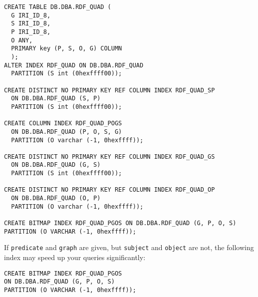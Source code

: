 \begin{siderules}
\begin{verbatim}
CREATE TABLE DB.DBA.RDF_QUAD (
  G IRI_ID_8,
  S IRI_ID_8,
  P IRI_ID_8,
  O ANY,
  PRIMARY key (P, S, O, G) COLUMN
  );
ALTER INDEX RDF_QUAD ON DB.DBA.RDF_QUAD
  PARTITION (S int (0hexffff00));

CREATE DISTINCT NO PRIMARY KEY REF COLUMN INDEX RDF_QUAD_SP
  ON DB.DBA.RDF_QUAD (S, P)
  PARTITION (S int (0hexffff00));

CREATE COLUMN INDEX RDF_QUAD_POGS
  ON DB.DBA.RDF_QUAD (P, O, S, G)
  PARTITION (O varchar (-1, 0hexffff));

CREATE DISTINCT NO PRIMARY KEY REF COLUMN INDEX RDF_QUAD_GS
  ON DB.DBA.RDF_QUAD (G, S)
  PARTITION (S int (0hexffff00));

CREATE DISTINCT NO PRIMARY KEY REF COLUMN INDEX RDF_QUAD_OP
  ON DB.DBA.RDF_QUAD (O, P)
  PARTITION (O varchar (-1, 0hexffff));

CREATE BITMAP INDEX RDF_QUAD_PGOS ON DB.DBA.RDF_QUAD (G, P, O, S)
PARTITION (O VARCHAR (-1, 0hexffff));
\end{verbatim}
\end{siderules}

  If \texttt{predicate} and \texttt{graph} are given, but \texttt{subject} and
  \texttt{object} are not, the following index may speed up your queries
  significantly:

\begin{siderules}
\begin{verbatim}
CREATE BITMAP INDEX RDF_QUAD_PGOS
ON DB.DBA.RDF_QUAD (G, P, O, S)
PARTITION (O VARCHAR (-1, 0hexffff));
\end{verbatim}
\end{siderules}

